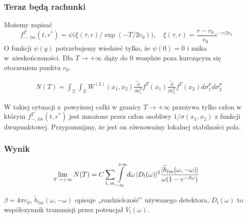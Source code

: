 \documentclass[10pt,t]{beamer}
\begin{document}
\begin{frame}
  \frametitle{Teraz będą rachunki}


  Możemy zapisać
  \begin{equation}
    \label{eq:Promieniowanie-Hawkinga-32}
    f^{ T }_{ -,\, l m }( t, r^{ * } ) =
    \psi\big( \xi( \tau, r ) / \exp( -T / 2 r_{ 0 } ) \big), \quad
    \xi( \tau, r ) =
    \frac{ r - r_{ 0 } }{ r_{ 0 } } e^{ -\tau / 2 r_{ 0 } }
  \end{equation}
  O funkcji $\psi( y )$ potrzebujemy wiedzieć tylko, że
  $\psi( 0 ) = 0$ i znika w~nieskończoności. Dla $T \to +\infty$ dąży
  do $0$ wszędzie poza kurczącym się otoczeniem punktu $r_{ 0 }$.

  \begin{equation}
    \label{eq:Promieniowanie-Hawkinga-33}
    \begin{split}
      &N( T ) =
        \int_{ \Sigma } \int_{ \Sigma } W^{ ( 2 ) }( x_{ 1 }, x_{ 2 } )
        \overleftrightarrow{ \frac{ \partial }{ \partial x_{ 1 }^{ \mu } } }
        f^{ T }( x_{ 1 } ) \overleftrightarrow{ \frac{ \partial }{ \partial x_{ 2 }^{ \mu } } }
        f^{ T }( x_{ 2 } ) d\sigma_{ 1 }^{ \mu } d\sigma_{ 2 }^{ \mu }
    \end{split}
  \end{equation}

  W takiej sytuacji z~powyższej całki w granicy $T \to +\infty$
  przeżywa tylko człon w którym $f^{ T }_{ -,\, l m }( t, r^{ * } )$
  jest mnożone przez człon osobliwy $1 / \sigma( x_{ 1 }, x_{ 2 } )$ z
  funkcji dwupunktowej. Przypomnijmy, że jest on równoważny lokalnej
  stabilności pola.

\end{frame}





\begin{frame}
  \frametitle{Wynik}


  \begin{equation}
    \label{eq:Promieniowanie-Hawkinga-34}
    \lim_{ T \to +\infty } N( T ) =
    C \sum_{ l,\, m }
    \int\limits_{ -\infty }^{ +\infty } d\omega \, \lvert{  D_{ l }( \omega )  }\rvert^{ 2 }
    \frac{ \lvert{  \widetilde{h}_{ lm }( \omega, -\omega )  }\rvert }{ \omega ( 1 - e^{ -\beta \omega } ) }
  \end{equation}

  $\beta = 4 \pi r_{ 0 }$, $\widetilde{h}_{ lm }( \omega, -\omega )$
  opisuje „rozdzielczość” używanego detektora, $D_{ l }( \omega )$ to
  współczynnik transmisji przez potencjał $V_{ l }( \omega )$.

\end{frame}
\end{document}
